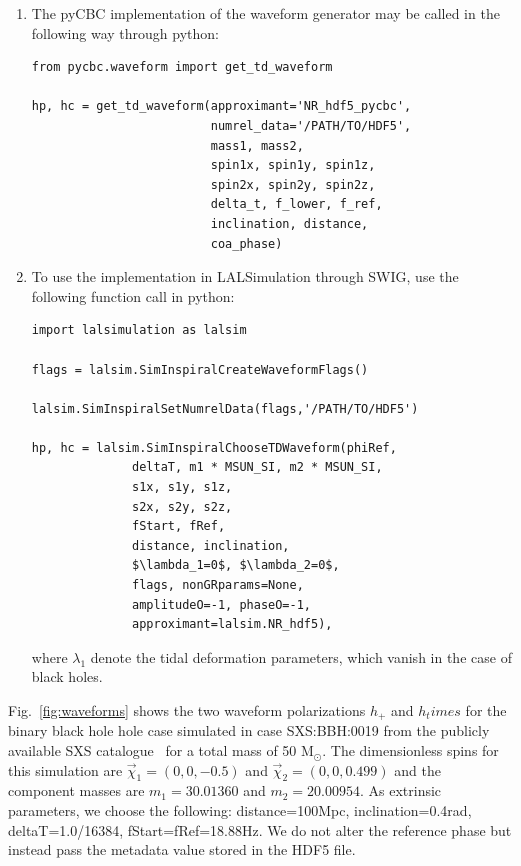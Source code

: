 \documentclass[aps,prd,amssymb,amsmath,amsfonts,superscriptaddress,
floatfix ,preprintnumbers,altaffilletter]{revtex4}
\begin{document}
\begin{enumerate}
  \item The pyCBC implementation of the waveform generator may be called in the following way through python: \\
\begin{lstlisting}
from pycbc.waveform import get_td_waveform 

hp, hc = get_td_waveform(approximant='NR_hdf5_pycbc', 
                         numrel_data='/PATH/TO/HDF5',
                         mass1, mass2,
                         spin1x, spin1y, spin1z,
                         spin2x, spin2y, spin2z, 
                         delta_t, f_lower, f_ref,
                         inclination, distance, 
                         coa_phase)
\end{lstlisting}

\item To use the implementation in LALSimulation through SWIG, use the following function call in python:\\
\begin{lstlisting}[mathescape=true]
import lalsimulation as lalsim

flags = lalsim.SimInspiralCreateWaveformFlags()

lalsim.SimInspiralSetNumrelData(flags,'/PATH/TO/HDF5')

hp, hc = lalsim.SimInspiralChooseTDWaveform(phiRef, 
              deltaT, m1 * MSUN_SI, m2 * MSUN_SI, 
              s1x, s1y, s1z,
              s2x, s2y, s2z, 
              fStart, fRef, 
              distance, inclination,
              $\lambda_1=0$, $\lambda_2=0$, 
              flags, nonGRparams=None, 
              amplitudeO=-1, phaseO=-1, 
              approximant=lalsim.NR_hdf5),
\end{lstlisting}
where $\lambda_1$ denote the tidal deformation parameters, which vanish in the case of black holes. 
\end{enumerate}
Fig.~\ref{fig:waveforms} shows the two waveform polarizations $h_+$ and $h_times$ for the binary black hole hole case simulated in case 
SXS:BBH:0019 from the publicly available SXS catalogue~\cite{Mroue:2013xna} for a total mass of 50 $\mathrm{M}_\odot$. The dimensionless spins for this simulation are
$\vec{\chi}_1=(0,0,-0.5)$ and $\vec{\chi}_2=(0,0,0.499)$ and the component masses are $m_1=30.01360$ and $m_2=20.00954$.
As extrinsic parameters, we choose the following: distance=100Mpc, inclination=0.4rad, deltaT=1.0/16384, fStart=fRef=18.88Hz. We do not alter
the reference phase but instead pass the metadata value stored in the HDF5 file.
\end{document}
